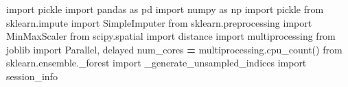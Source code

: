 \documentclass[
  11pt,
  oneside]{book}
\newenvironment{Shaded}{\begin{snugshade}}{\end{snugshade}}
\newcommand{\ImportTok}[1]{#1}
\newcommand{\NormalTok}[1]{#1}
\newcommand{\OperatorTok}[1]{\textcolor[rgb]{0.81,0.36,0.00}{\textbf{#1}}}
\begin{document}
\begin{Shaded}
\begin{Highlighting}[]
\ImportTok{import}\NormalTok{ pickle}
\ImportTok{import}\NormalTok{ pandas }\ImportTok{as}\NormalTok{ pd}
\ImportTok{import}\NormalTok{ numpy }\ImportTok{as}\NormalTok{ np}
\ImportTok{import}\NormalTok{ pickle}
\ImportTok{from}\NormalTok{ sklearn.impute }\ImportTok{import}\NormalTok{ SimpleImputer}
\ImportTok{from}\NormalTok{ sklearn.preprocessing }\ImportTok{import}\NormalTok{ MinMaxScaler}
\ImportTok{from}\NormalTok{ scipy.spatial }\ImportTok{import}\NormalTok{ distance}
\ImportTok{import}\NormalTok{ multiprocessing}
\ImportTok{from}\NormalTok{ joblib }\ImportTok{import}\NormalTok{ Parallel, delayed}
\NormalTok{num\_cores }\OperatorTok{=}\NormalTok{ multiprocessing.cpu\_count()}
\ImportTok{from}\NormalTok{ sklearn.ensemble.\_forest }\ImportTok{import}\NormalTok{ \_generate\_unsampled\_indices}
\ImportTok{import}\NormalTok{ session\_info}
\end{Highlighting}
\end{Shaded}
\end{document}
